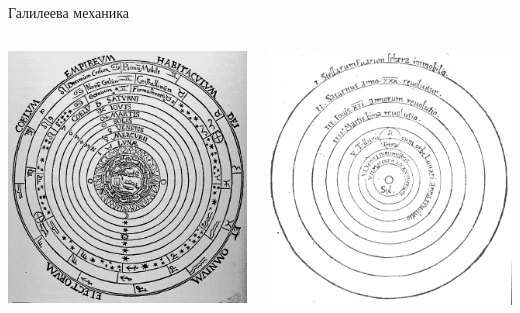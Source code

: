 \documentclass[10pt,a4paper]{beamer}
\begin{document}
        \begin{frame}{ Галилеева механика }
            \begin{columns}
                \begin{column}{0.2\textwidth}
                    \includegraphics[width=\textwidth]{images/aristotel_universe.png}
                \end{column}
                \begin{column}{0.6\textwidth}
                    \includegraphics[width=\textwidth]{images/galilei_copernic_model.png}
                \end{column}
            \end{columns}
        \end{frame}
        
\end{document}
